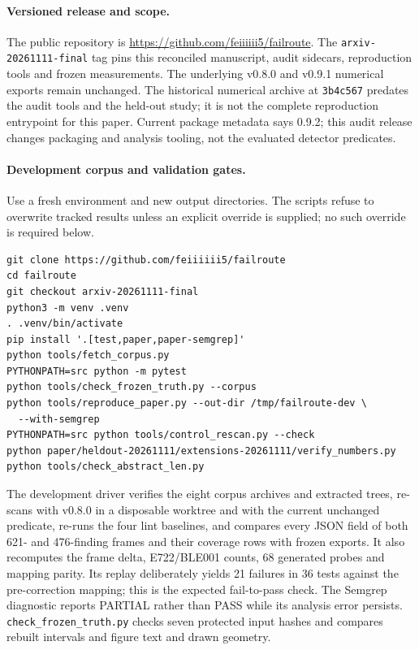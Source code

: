 \documentclass[10pt,a4paper]{article}
\begin{document}
\paragraph{Versioned release and scope.}
The public repository is \url{https://github.com/feiiiiii5/failroute}.
The \texttt{arxiv-20261111-final} tag pins this reconciled manuscript, audit
sidecars, reproduction tools and frozen measurements. The underlying
v0.8.0 and v0.9.1 numerical exports remain unchanged. The historical
numerical archive at \texttt{3b4c567} predates the audit tools and the
held-out study; it is not the complete reproduction entrypoint for this
paper. Current package metadata says 0.9.2; this audit release changes
packaging and analysis tooling, not the evaluated detector predicates.

\paragraph{Development corpus and validation gates.}
Use a fresh environment and new output directories. The scripts refuse to
overwrite tracked results unless an explicit override is supplied; no
such override is required below.
\begin{verbatim}
git clone https://github.com/feiiiiii5/failroute
cd failroute
git checkout arxiv-20261111-final
python3 -m venv .venv
. .venv/bin/activate
pip install '.[test,paper,paper-semgrep]'
python tools/fetch_corpus.py
PYTHONPATH=src python -m pytest
python tools/check_frozen_truth.py --corpus
python tools/reproduce_paper.py --out-dir /tmp/failroute-dev \
  --with-semgrep
PYTHONPATH=src python tools/control_rescan.py --check
python paper/heldout-20261111/extensions-20261111/verify_numbers.py
python tools/check_abstract_len.py
\end{verbatim}
The development driver verifies the eight corpus archives and extracted trees,
re-scans with v0.8.0 in a disposable worktree and with the current unchanged
predicate, re-runs the four lint baselines, and compares every JSON field of
both 621- and 476-finding frames and their coverage rows with frozen exports.
It also recomputes the frame delta, E722/BLE001 counts, 68 generated probes
and mapping parity. Its replay deliberately yields 21 failures in 36 tests
against the pre-correction mapping; this is the expected fail-to-pass check.
The Semgrep diagnostic reports PARTIAL rather than PASS while its analysis
error persists. \texttt{check\_frozen\_truth.py} checks seven protected input
hashes and compares rebuilt intervals and figure text and drawn geometry.
\end{document}
